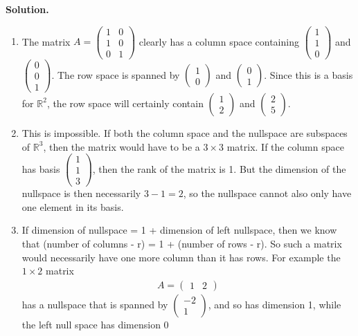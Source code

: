 \documentclass[11pt]{article}
\begin{document}
\noindent \textbf{Solution.} \\
\begin{enumerate}
\item The matrix $A = \begin{pmatrix} 1 & 0 \\ 1 & 0 \\ 0 & 1 \end{pmatrix}$ clearly has a column space containing  $\begin{pmatrix} 1\\1\\0 \end{pmatrix}$ and $\begin{pmatrix} 0\\0\\1 \end{pmatrix}$. The row space is spanned by $\begin{pmatrix} 1 \\ 0 \end{pmatrix}$ and $\begin{pmatrix} 0 \\ 1 \end{pmatrix}$. Since this is a basis for $\mathbb{R}^2$, the row space will certainly contain $\begin{pmatrix} 1\\2 \end{pmatrix}$ and $\begin{pmatrix} 2 \\5 \end{pmatrix}$.

\item This is impossible. If both the column space and the nullspace are subspaces of $\mathbb{R}^3$, then the matrix would have to be a $3 \times 3$ matrix. If the column space has basis $\begin{pmatrix} 1 \\ 1 \\ 3 \end{pmatrix}$, then the rank of the matrix is 1. But the dimension of the nullspace is then necessarily $3-1=2$, so the nullspace cannot also only have one element in its basis.

\item If dimension of nullspace = 1 + dimension of left nullspace, then we know that (number of columns - r) = 1 + (number of rows - r). So such a matrix would necessarily have one more column than it has rows. For example the $1 \times 2$ matrix 
\begin{align}
A = \begin{pmatrix} 1 & 2 \end{pmatrix}
\end{align}
has a nullspace that is spanned by $\begin{pmatrix} -2 \\ 1 \end{pmatrix}$, and so has dimension 1, while the left null space has dimension $0$


\end{enumerate}
\end{document}
